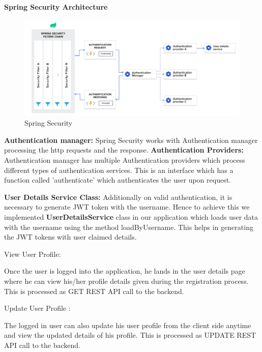 \begin{enumerate}
    \textbf{Spring Security Architecture}
     \begin{figure}[h!]
        \begin{center}
          \includegraphics[scale=0.8]{images/springsecurity.PNG}
            \centering \caption{Spring Security}
    \end{center}
    \end{figure}
\textbf{Authentication manager:} \newline
    Spring Security works with Authentication manager processing the http requests and the response.
 \textbf{Authentication Providers:} \newline   
    Authentication manager has multiple Authentication providers which process different types of authentication services. This is an interface which has a function called 'authenticate' which authenticates the user upon request.
    
     \textbf{User Details Service Class:} \newline   
     Additionally on valid authentication, it is necessary to generate JWT token with the username. Hence to achieve this we implemented \textbf{UserDetailsService} class in our application which loads user data with the username using the method loadByUsername. This helps in generating the JWT tokens with user claimed details.
    
   

       {\bf \item  View User Profile:} \newline
        Once the user is logged into the application, he lands in the user details page where he can view his/her profile details given during the registration process. This is processed as GET REST API call to the backend.
        
        {\bf \item  Update User Profile :}\newline
        The logged in user can also update his user profile from the client side anytime and view the updated details of his profile. This is processed as UPDATE REST API call to the backend.


\end{enumerate}
